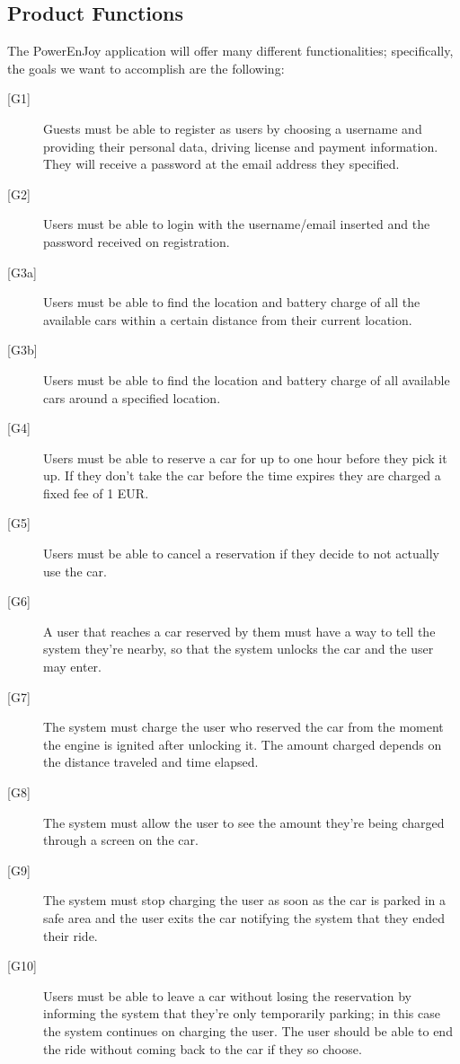 \documentclass[english]{article}
\begin{document}
\subsection{Product Functions}

The PowerEnJoy application will offer many different functionalities; specifically, the goals we want to accomplish are the following:
\begin{description}
	\item[{[G1]}]{Guests must be able to register as users by choosing a username and providing their personal data, driving license and payment information. They will receive a password at the email address they specified.}
	\item[{[G2]}]{Users must be able to login with the username/email inserted and the password received on registration.}
	\item[{[G3a]}]{Users must be able to find the location and battery charge of all the available cars within a certain distance from their current location.}
	\item[{[G3b]}]{Users must be able to find the location and battery charge of all available cars around a specified location.}
	\item[{[G4]}]{Users must be able to reserve a car for up to one hour before they pick it up. If they don't take the car before the time expires they are charged a fixed fee of 1 EUR.}
	\item[{[G5]}]{Users must be able to cancel a reservation if they decide to not actually use the car.}
	\item[{[G6]}]{A user that reaches a car reserved by them must have a way to tell the system they’re nearby, so that the system unlocks the car and the user may enter.}
	\item[{[G7]}]{The system must charge the user who reserved the car from the moment the engine is ignited after unlocking it. The amount charged depends on the distance traveled and time elapsed.}
	\item[{[G8]}]{The system must allow the user to see the amount they’re being charged through a screen on the car.}
	\item[{[G9]}]{The system must stop charging the user as soon as the car is parked in a safe area and the user exits the car notifying the system that they ended their ride.}
	\item[{[G10]}]{Users must be able to leave a car without losing the reservation by informing the system that they’re only temporarily parking; in this case the system continues on charging the user. The user should be able to end the ride without coming back to the car if they so choose.}

\end{description}
\end{document}
